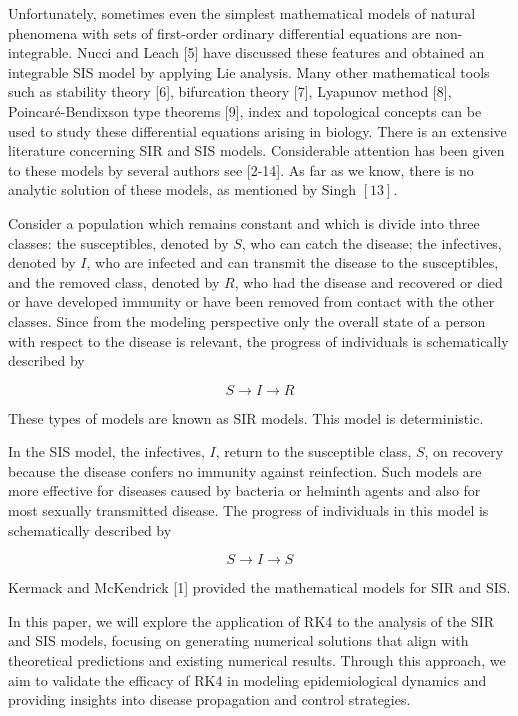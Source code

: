 \documentclass[10pt]{article}
\begin{document}
Unfortunately, sometimes even the simplest mathematical models of natural phenomena with sets of first-order ordinary differential equations are non-integrable. Nucci and Leach [5] have discussed these features and obtained an integrable SIS model by applying Lie analysis. Many other mathematical tools such as stability theory [6], bifurcation theory [7], Lyapunov method [8], Poincaré-Bendixson type theorems [9], index and topological concepts can be used to study these differential equations arising in biology. There is an extensive literature concerning SIR and SIS models. Considerable attention has been given to these models by several authors see [2-14]. As far as we know, there is no analytic solution of these models, as mentioned by Singh $[13]$.

Consider a population which remains constant and which is divide into three classes: the susceptibles, denoted by $S$, who can catch the disease; the infectives, denoted by $I$, who are infected and can transmit the disease to the susceptibles, and the removed class, denoted by $R$, who had the disease and recovered or died or have developed immunity or have been removed from contact with the other classes. Since from the modeling perspective only the overall state of a person with respect to the disease is relevant, the progress of individuals is schematically described by

$$
S \rightarrow I \rightarrow R
$$




These types of models are known as SIR models. This model is deterministic.

In the SIS model, the infectives, $I$, return to the susceptible class, $S$, on recovery because the disease confers no immunity against reinfection. Such models are more effective for diseases caused by bacteria or helminth agents and also for most sexually transmitted disease. The progress of individuals in this model is schematically described by

$$
S \rightarrow I \rightarrow S
$$

Kermack and McKendrick [1] provided the mathematical models for SIR and SIS.

In this paper, we will explore the application of RK4 to the analysis of the SIR and SIS models, focusing on generating numerical solutions that align with theoretical predictions and existing numerical results. Through this approach, we aim to validate the efficacy of RK4 in modeling epidemiological dynamics and providing insights into disease propagation and control strategies.
\end{document}
